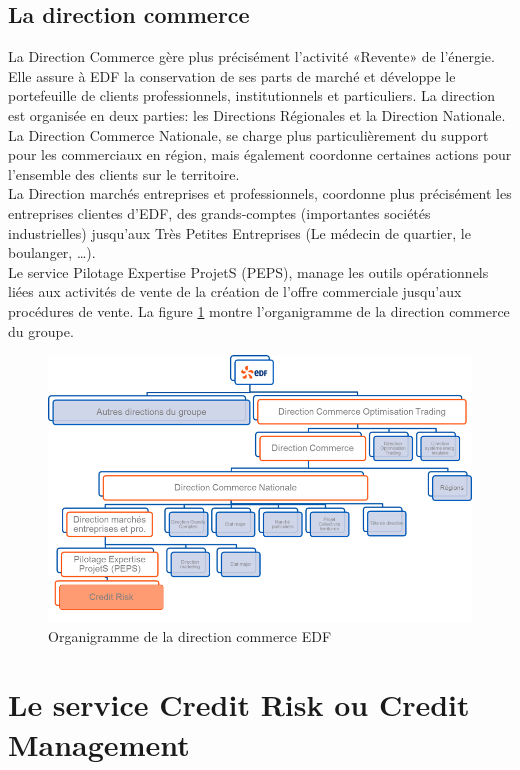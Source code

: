 \documentclass[11pt,a4paper]{article}
\begin{document}
\subsection{La direction commerce}
La Direction Commerce gère plus précisément l’activité «Revente» de l’énergie. Elle assure à EDF la conservation de ses parts de marché et développe le portefeuille de clients professionnels, institutionnels et particuliers. La direction est organisée en deux parties: les Directions Régionales et la Direction Nationale.\\
La Direction Commerce Nationale, se charge plus particulièrement du support pour les commerciaux en région, mais également coordonne certaines actions pour l’ensemble des clients sur le territoire. \\
La Direction marchés entreprises et professionnels, coordonne plus précisément les entreprises clientes d’EDF, des grands-comptes (importantes sociétés industrielles) jusqu’aux Très Petites Entreprises (Le médecin de quartier, le boulanger, …).\\ 
Le service Pilotage Expertise ProjetS (PEPS), manage les outils opérationnels liées aux activités de vente de la création de l’offre commerciale jusqu’aux procédures de vente. La figure \ref{figure_organigramme} montre l'organigramme de la direction commerce du groupe. 

\begin{figure}[h]
 \centering
 \includegraphics[scale=1.2]{direction_commerce.png}
 \caption{Organigramme de la direction commerce EDF}
 \label{figure_organigramme}
\end{figure}

\section{Le service Credit Risk ou Credit Management}
\end{document}
